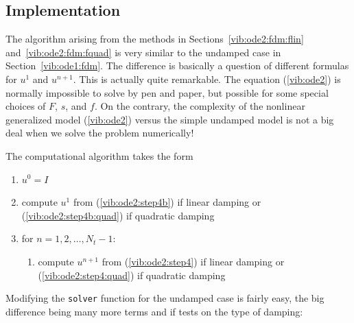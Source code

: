 \documentclass[%
oneside,                 %
final,                   %
10pt]{article}
\begin{document}
\subsection{Implementation}
\label{vib:ode2:solver}

The algorithm arising from the methods in Sections~\ref{vib:ode2:fdm:flin}
and~\ref{vib:ode2:fdm:fquad} is very similar to the undamped case in
Section~\ref{vib:ode1:fdm}. The difference is
basically a question of different formulas for $u^1$ and
$u^{n+1}$. This is actually quite remarkable. The equation
(\ref{vib:ode2}) is normally impossible to solve by pen and paper, but
possible for some special choices of $F$, $s$, and $f$. On the
contrary, the complexity of the
nonlinear generalized model (\ref{vib:ode2}) versus the
simple undamped model is not a big deal when we solve the
problem numerically!

The computational algorithm takes the form

\begin{enumerate}
 \item $u^0=I$

 \item compute $u^1$ from (\ref{vib:ode2:step4b}) if linear
    damping or (\ref{vib:ode2:step4b:quad}) if quadratic damping

 \item for $n=1,2,\ldots,N_t-1$:
\begin{enumerate}

   \item compute $u^{n+1}$ from (\ref{vib:ode2:step4}) if linear
      damping or (\ref{vib:ode2:step4:quad}) if quadratic damping
\end{enumerate}

\noindent
\end{enumerate}

\noindent
Modifying the \texttt{solver} function for the undamped case is fairly
easy, the big difference being many more terms and if tests on
the type of damping:
\end{document}
